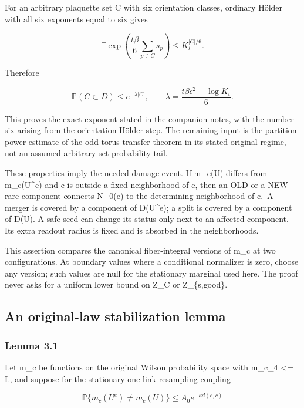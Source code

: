 \documentclass[
  11pt,
]{article}
\begin{document}
For an arbitrary plaquette set C with six orientation classes, ordinary
Hölder with all six exponents equal to six gives

\[
 \boxed{\quad
 \mathbb E\exp\!\left(\frac{t\beta}{6}
                      \sum_{p\in C}s_p\right)
 \le K_t^{|C|/6}.
 \quad}
 \tag{2.5}
\]

Therefore

\[
 \boxed{\quad
 \mathbb P(C\subset D)\le e^{-\lambda |C|},\qquad
 \lambda=\frac{t\beta\epsilon^2-\log K_t}{6}.
 \quad}
 \tag{2.6}
\]

This proves the exact exponent stated in the companion notes, with the
number six arising from the orientation Hölder step. The remaining
input is the partition-power estimate of the odd-torus transfer theorem in its stated
original regime, not an assumed arbitrary-set probability tail.

These properties imply the needed damage event. If m\_c(U) differs from
m\_c(U\^{}e) and c is outside a fixed neighborhood of e, then an OLD or
a NEW rare component connects N\_0(e) to the determining neighborhood of
c.~A merger is covered by a component of D(U\^{}e); a split is covered
by a component of D(U). A safe seed can change its status only next to
an affected component. Its extra readout radius is fixed and is absorbed
in the neighborhoods.

This assertion compares the canonical fiber-integral versions of m\_c at
two configurations. At boundary values where a conditional normalizer is
zero, choose any version; such values are null for the stationary
marginal used here. The proof never asks for a uniform lower bound on
Z\_C or Z\_\{s,good\}.

\hypertarget{an-original-law-stabilization-lemma}{%
\subsection{An original-law stabilization
lemma}\label{an-original-law-stabilization-lemma}}

\hypertarget{lemma-3.1}{%
\subsubsection{Lemma 3.1}\label{lemma-3.1}}

Let m\_c be functions on the original Wilson probability space with
\textbar\textbar m\_c\textbar\textbar\_4 \textless= L, and suppose for
the stationary one-link resampling coupling

\[
 \mathbb P\{m_c(U^e)\ne m_c(U)\}
 \le A_0 e^{-\kappa d(e,c)}
 \tag{3.1}
\]
\end{document}
